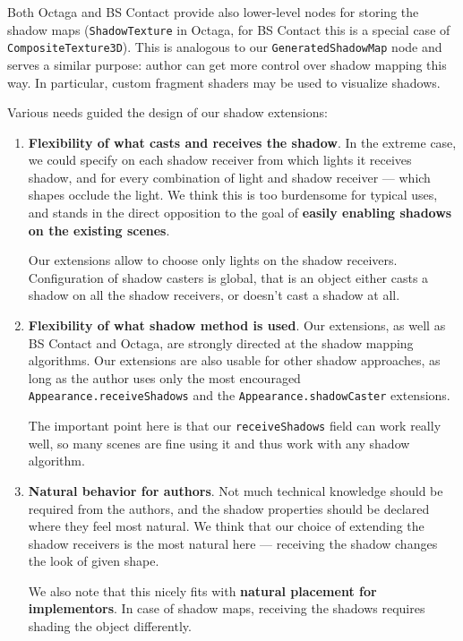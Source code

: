 \documentclass{acmsiggraph}                     %
\begin{document}
Both Octaga and BS Contact provide also lower-level nodes for
storing the shadow maps (\texttt{ShadowTexture} in Octaga, for BS Contact
this is a special case of \texttt{CompositeTexture3D}). This is
analogous to our \texttt{GeneratedShadowMap} node and serves a similar
purpose: author can get more control over shadow mapping this way.
In particular, custom fragment shaders may be used to visualize shadows.

Various needs guided the design of our shadow extensions:

\begin{enumerate}
\itemsep 0pt
\item \textbf{Flexibility of what casts and receives the shadow}. In the
  extreme case, we could specify on each shadow receiver from
  which lights it receives shadow, and for every combination of light and
  shadow receiver --- which shapes occlude the light. We think
  this is too burdensome for typical uses, and stands in the direct
  opposition to the goal of \textbf{easily enabling shadows on the
  existing scenes}.

  Our extensions allow to choose only lights on the shadow
  receivers. Configuration of shadow casters is global, that is an
  object either casts a shadow on all the shadow receivers, or doesn't
  cast a shadow at all.

\item \textbf{Flexibility of what shadow method is used}. Our
  extensions, as well as BS Contact and Octaga, are strongly directed at the
  shadow mapping algorithms. Our extensions are also usable for other
  shadow approaches, as long as the author uses only the most
  encouraged \texttt{Appearance.receiveShadows} and the
  \texttt{Appearance.shadowCaster} extensions.

  The important point here
  is that our \texttt{receiveShadows} field can work really well,
  so many scenes are fine using it
  and thus work with any shadow algorithm.

\item \textbf{Natural behavior for authors}. Not much technical
  knowledge should be required from the authors, and the shadow
  properties should be declared where they feel most natural. We think
  that our choice of extending the shadow receivers is the most
  natural here --- receiving the shadow changes the look of given
  shape.

  We also note that this nicely fits with \textbf{natural placement
  for implementors}. In case of shadow maps, receiving the shadows
  requires shading the object differently.
\end{enumerate}
\end{document}
